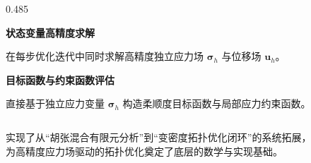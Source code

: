 \documentclass[notheorems]{beamer}
\begin{document}
\begin{frame}
\begin{columns}[T, totalwidth=\linewidth]
\begin{column}{0.485\linewidth}
\begin{tcolorbox}
{						\textbf{\enspace 状态变量高精度求解}\par
						\vspace{2pt}
						在每步优化迭代中同时求解高精度独立应力场 $\boldsymbol{\sigma}_h$ 与位移场 $\boldsymbol{u}_h$。
						
						\vspace{8pt}
						\textbf{\enspace 目标函数与约束函数评估}\par
						\vspace{2pt}
						直接基于独立应力变量 $\boldsymbol{\sigma}_h$ 构造柔顺度目标函数与局部应力约束函数。
					}
				\end{tcolorbox}
			\end{column}
			
		\end{columns}
		
		\begin{tcolorbox}[
			colback=structure.fg, colframe=structure.fg,
			arc=3pt, boxrule=0pt,
			top=4pt, bottom=4pt, left=8pt, right=8pt]
			\centering
			{\fontsize{8.5}{12}\selectfont\sffamily\color{white}
				实现了从“胡张混合有限元分析”到“变密度拓扑优化闭环”的系统拓展，\\
				为高精度应力场驱动的拓扑优化奠定了底层的数学与实现基础。}
		\end{tcolorbox}
		
	\end{frame}
	
	
\end{document}
